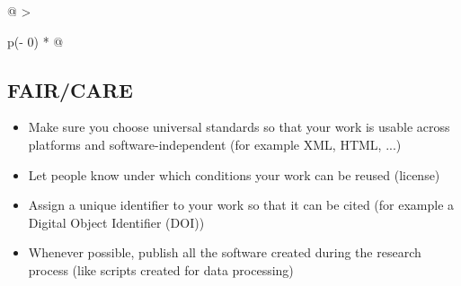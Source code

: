 \documentclass[
  letterpaper,
  DIV=11,
  numbers=noendperiod]{scrreprt}
\begin{document}
\begin{longtable}[]{@{}
  >{\raggedright\arraybackslash}p{(\columnwidth - 0\tabcolsep) * }@{}}
\toprule\noalign{}
\begin{minipage}[b]{\linewidth}\raggedright
\subsection{\texorpdfstring{\textbf{FAIR/CARE}}{FAIR/CARE}}\label{faircare}

\begin{itemize}
\item
  Make sure you choose universal standards so that your work is usable
  across platforms and software-independent (for example XML, HTML, ...)
\item
  Let people know under which conditions your work can be reused
  (license)
\item
  Assign a unique identifier to your work so that it can be cited (for
  example a Digital Object Identifier (DOI))
\item
  Whenever possible, publish all the software created during the
  research process (like scripts created for data processing)
\end{itemize}
\end{minipage} \\
\midrule\noalign{}
\endhead
\bottomrule\noalign{}
\endlastfoot
 \\
\end{longtable}
\end{document}
